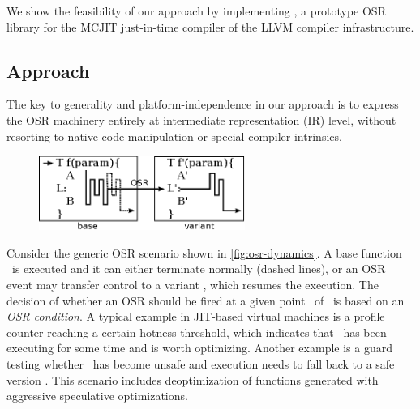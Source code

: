 \noindent We show the feasibility of our approach by implementing \osrkit, a prototype OSR library for the MCJIT just-in-time compiler of the LLVM compiler infrastructure.

\subsection{Approach}
\label{ss:osr-llvm-approach}

The key to generality and platform-independence in our approach is to express the OSR machinery entirely at intermediate representation (IR) level, without resorting to native-code manipulation or special compiler intrinsics.

\ifdefined\noauthorea
\begin{figure}[hb]
\vspace{4mm} %
\begin{center}
\includegraphics[width=0.6\textwidth]{figures/osr-dynamics/osr-dynamics.eps}
\caption{\protect}
\end{center}
\end{figure}
\fi

\noindent Consider the generic OSR scenario shown in \myfigure\ref{fig:osr-dynamics}. A base function \fbase\ is executed and it can either terminate normally (dashed lines), or an OSR event may transfer control to a variant \fvariant, which resumes the execution. The decision of whether an OSR should be fired at a given point \osrpoint\ of \fbase\ is based on an {\em OSR condition}. A typical example in JIT-based virtual machines is a profile counter reaching a certain hotness threshold, which indicates that \fbase\ has been executing for some time and is worth optimizing. Another example is a guard testing whether \fbase\ has become unsafe and execution needs to fall back to a safe version \fvariant. This scenario includes deoptimization of functions generated with aggressive speculative optimizations.


